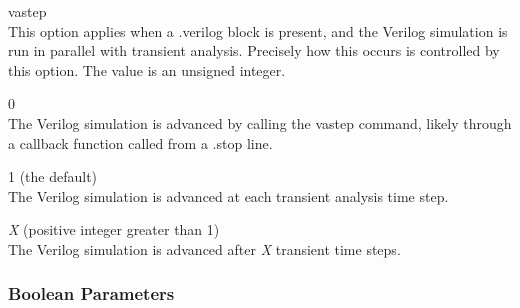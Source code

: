 \begin{description}
\item{\et vastep}\\
This option applies when a {\vt .verilog} block is present, and the
Verilog simulation is run in parallel with transient analysis. 
Precisely how this occurs is controlled by this option.  The value is
an unsigned integer.

\begin{description}
\item{0}\\
The Verilog simulation is advanced by calling the {\cb vastep}
command, likely through a callback function called from a {\vt .stop}
line.

\item{1} (the default)\\
The Verilog simulation is advanced at each transient analysis
time step.

\item{\it X} (positive integer greater than 1)\\
The Verilog simulation is advanced after {\it X} transient time
steps.
\end{description}

\end{description}

\subsubsection{Boolean Parameters}

